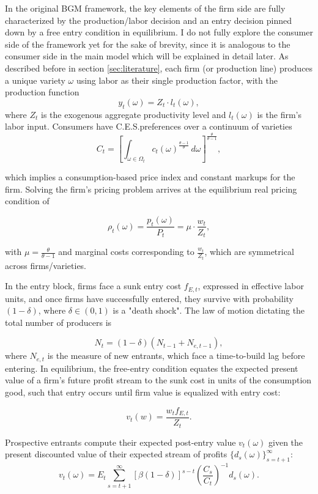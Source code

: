 \documentclass[a4paper,12pt]{article} %
\numberwithin{equation}{section} %
\numberwithin{figure}{section}
\numberwithin{table}{section}
\begin{document}
In the original BGM framework, the key elements of the firm side are fully characterized by the production/labor decision 
and an entry decision pinned down by a free entry condition in equilibrium. I do not fully explore the consumer side of the framework yet for the sake of brevity, since it is analogous to the consumer side in the main model which will be 
explained in detail later. As described before in section \ref{sec:literature}, each firm (or production line) produces a unique variety $\omega$ using labor as their single 
production factor, with the production function 
\[
    y_t(\omega) = Z_t \cdot l_t(\omega),
\]
where $Z_t$ is the exogenous aggregate productivity level and $l_t(\omega)$ is the firm's labor input. Consumers have C.E.S.preferences over a continuum
of varieties 
\[
    C_t = \left[\int_{\omega \in \Omega_t} c_t(\omega)^{\frac{\theta-1}{\theta}}\,d\omega\right]^{\frac{\theta}{\theta-1}},
\]

which implies a consumption-based price index and constant markups for the firm. Solving the firm's pricing problem arrives at the equilibrium real pricing
condition of

 \[
    \rho_t(\omega) = \frac{p_t(\omega)}{P_t} =  \mu \cdot \frac{w_t}{Z_t},
 \]

with $\mu=\frac{\theta}{\theta-1}$ and marginal costs corresponding to $\frac{w_t}{Z_t}$, which are symmetrical across firms/varieties.

In the entry block, firms face a sunk entry cost $f_{E,t}$, expressed in effective labor units, and once firms have successfully entered, they survive
with probability $(1-\delta)$, where $\delta \in (0,1)$ is a "death shock". The law of motion dictating the total number of producers is 

    \[
    N_t = (1-\delta)(N_{t-1} + N_{e,t-1}),
    \]
where $N_{e,t}$ is the measure of new entrants, which face a time-to-build lag before entering. In equilibrium, the free-entry condition equates the expected present value of a firm's
future profit stream to the sunk cost in units of the consumption good, such that entry occurs until firm value is equalized with entry cost:

\[
    v_t(w) = \frac{w_t f_{E,t}}{Z_t}.
\]

Prospective entrants compute their expected post-entry value $v_t(\omega)$ given the present discounted value of their expected stream of profits
$\{d_s(\omega)\}_{s=t+1}^\infty$: 
$$v_{t}(\omega) = E_t \sum_{s = t+1}^{\infty} \left[ \beta (1 - \delta) \right]^{s - t} \left( \frac{C_{s}}{C_{t}} \right)^{-1} d_{s}(\omega).$$
\end{document}
